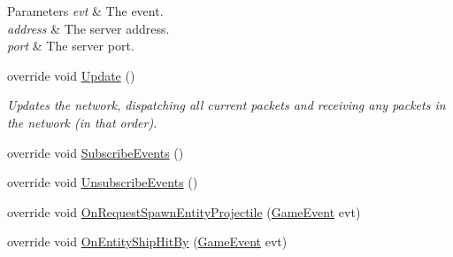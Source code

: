 \begin{DoxyCompactItemize}
\begin{DoxyCompactList}
\begin{DoxyParams}{Parameters}
{\em evt} & The event.\\
\hline
{\em address} & The server address.\\
\hline
{\em port} & The server port.\\
\hline
\end{DoxyParams}
 \end{DoxyCompactList}\item 
\hypertarget{class_skyrates_1_1_client_1_1_network_1_1_dummy_client_a293ecc1918e24e8da6002a2491277333}{override void \hyperlink{class_skyrates_1_1_client_1_1_network_1_1_dummy_client_a293ecc1918e24e8da6002a2491277333}{Update} ()}\label{class_skyrates_1_1_client_1_1_network_1_1_dummy_client_a293ecc1918e24e8da6002a2491277333}

\begin{DoxyCompactList}\small\item\em Updates the network, dispatching all current packets and receiving any packets in the network (in that order).  \end{DoxyCompactList}\item 
\hypertarget{class_skyrates_1_1_client_1_1_network_1_1_dummy_client_aa917662499560c267709d5704f2cdfb1}{override void \hyperlink{class_skyrates_1_1_client_1_1_network_1_1_dummy_client_aa917662499560c267709d5704f2cdfb1}{Subscribe\-Events} ()}\label{class_skyrates_1_1_client_1_1_network_1_1_dummy_client_aa917662499560c267709d5704f2cdfb1}

\item 
\hypertarget{class_skyrates_1_1_client_1_1_network_1_1_dummy_client_a369ccdfe91669af037a8aaf2ea4a8aae}{override void \hyperlink{class_skyrates_1_1_client_1_1_network_1_1_dummy_client_a369ccdfe91669af037a8aaf2ea4a8aae}{Unsubscribe\-Events} ()}\label{class_skyrates_1_1_client_1_1_network_1_1_dummy_client_a369ccdfe91669af037a8aaf2ea4a8aae}

\item 
\hypertarget{class_skyrates_1_1_client_1_1_network_1_1_dummy_client_a5102783742554da1eb2e0fd89af34ab7}{override void \hyperlink{class_skyrates_1_1_client_1_1_network_1_1_dummy_client_a5102783742554da1eb2e0fd89af34ab7}{On\-Request\-Spawn\-Entity\-Projectile} (\hyperlink{class_skyrates_1_1_client_1_1_game_1_1_event_1_1_game_event}{Game\-Event} evt)}\label{class_skyrates_1_1_client_1_1_network_1_1_dummy_client_a5102783742554da1eb2e0fd89af34ab7}

\item 
\hypertarget{class_skyrates_1_1_client_1_1_network_1_1_dummy_client_ae43c30a66d4bde821a82702ec26adafa}{override void \hyperlink{class_skyrates_1_1_client_1_1_network_1_1_dummy_client_ae43c30a66d4bde821a82702ec26adafa}{On\-Entity\-Ship\-Hit\-By} (\hyperlink{class_skyrates_1_1_client_1_1_game_1_1_event_1_1_game_event}{Game\-Event} evt)}\label{class_skyrates_1_1_client_1_1_network_1_1_dummy_client_ae43c30a66d4bde821a82702ec26adafa}


\end{DoxyCompactItemize}
